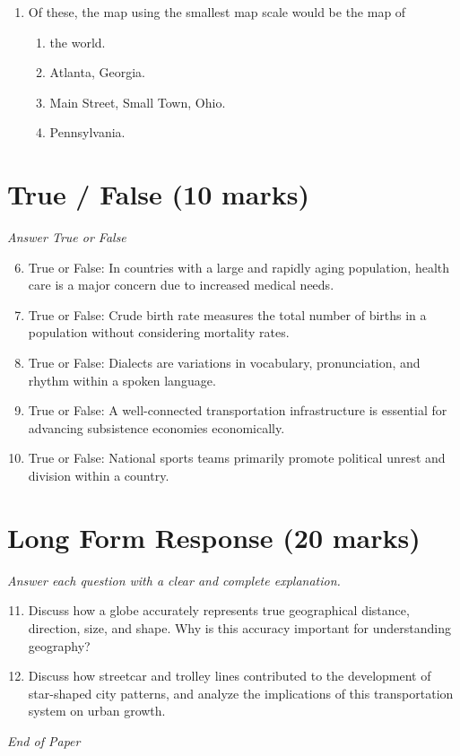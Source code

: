 \documentclass[12pt]{article}
\begin{document}
\begin{enumerate}[label=\arabic*.]
\begin{enumerate}[label=(\alph*)]
    \item A national holiday
    \item An attack by another country
    \item A charismatic national leader
\end{enumerate}
\item Of these, the map using the smallest map scale would be the map of
\begin{enumerate}[label=(\alph*)]
    \item the world.
    \item Atlanta, Georgia.
    \item Main Street, Small Town, Ohio.
    \item Pennsylvania.
\end{enumerate}
\end{enumerate}

\section*{True / False (10 marks)}
\textit{Answer True or False}
\begin{enumerate}[label=\arabic*.]
\setcounter{enumi}{5}
\item True or False: In countries with a large and rapidly aging population, health care is a major concern due to increased medical needs.
\item True or False: Crude birth rate measures the total number of births in a population without considering mortality rates.
\item True or False: Dialects are variations in vocabulary, pronunciation, and rhythm within a spoken language.
\item True or False: A well-connected transportation infrastructure is essential for advancing subsistence economies economically.
\item True or False: National sports teams primarily promote political unrest and division within a country.
\end{enumerate}

\section*{Long Form Response (20 marks)}
\textit{Answer each question with a clear and complete explanation.}
\begin{enumerate}[label=\arabic*.]
\setcounter{enumi}{10}
\item Discuss how a globe accurately represents true geographical distance, direction, size, and shape. Why is this accuracy important for understanding geography?
\item Discuss how streetcar and trolley lines contributed to the development of star-shaped city patterns, and analyze the implications of this transportation system on urban growth.
\end{enumerate}

\vfill
\noindent\textit{End of Paper}
\end{document}
